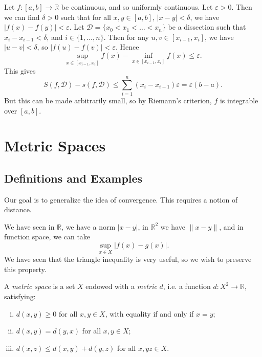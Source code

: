 \documentclass[12pt]{article}
\begin{document}
\begin{proofbox}
	Let $f : [a, b] \to \mathbb{R}$ be continuous, and so uniformly continuous. Let $\varepsilon > 0$. Then we can find $\delta > 0$ such that for all $x, y \in [a, b]$, $|x - y| < \delta$, we have $|f(x) - f(y)| < \varepsilon$. Let $\mathcal{D} = \{x_0 < x_1 < \ldots < x_n\}$ be a dissection such that $x_{i} - x_{i-1} < \delta$, and $i \in \{1, \ldots, n\}$. Then for any $u, v \in [x_{i-1}, x_i]$, we have $|u - v| < \delta$, so $|f(u) - f(v)| < \varepsilon$. Hence
	\[
		\sup_{x \in [x_{i-1}, x_i]} f(x) - \inf_{x \in [x_{i-1}, x_i]} f(x) \leq \varepsilon
	.\]
	This gives
	\[
		S(f, \mathcal{D}) - s(f, \mathcal{D}) \leq \sum_{i = 1}^{n}(x_i - x_{i-1})\varepsilon = \varepsilon(b - a)
	.\]
	But this can be made arbitrarily small, so by Riemann's criterion, $f$ is integrable over $[a, b]$.
\end{proofbox}

\newpage

\section{Metric Spaces}%
\label{sec:metric_spaces}

\subsection{Definitions and Examples}%
\label{sub:definitions_and_examples}

Our goal is to generalize the idea of convergence. This requires a notion of distance.

We have seen in $\mathbb{R}$, we have a norm $|x - y|$, in $\mathbb{R}^2$ we have $\|x - y\|$, and in function space, we can take
\[
	\sup_{x \in X}|f(x) - g(x)|
.\]
We have seen that the triangle inequality is very useful, so we wish to preserve this property.

\begin{definition}
	A \textit{metric space} is a set $X$ endowed with a \textit{metric} $d$, i.e. a function $d : X^2 \to \mathbb{R}$, satisfying:
	\begin{enumerate}[(i)]
		\item $d(x, y) \geq 0$ for all $x, y \in X$, with equality if and only if $x = y$;
		\item $d(x, y) = d(y, x)$ for all $x, y \in X$;
		\item $d(x, z) \leq d(x, y) + d(y, z)$ for all $x, y z \in X$.
	\end{enumerate}
\end{definition}
\end{document}
